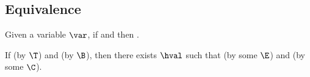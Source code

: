 \subsection*{Equivalence}
\begin{lemma}[Substitution]
\label{lem:substitution}
Given a variable $\var$, if \trahb{\hbctx}{\benv}{\bexp}{\bval} and  then .
\end{lemma}


\begin{lemma}[Soundness]
\label{lem:soundness-hb}
If \trahb{\hbctx}{\benv}{\hexp}{\bexp} (by $\T$) and \bev{\benv}{\bexp}{\bval} (by $\B$), then there exists $\hval$ such that \hev{\hexp}{\hval} (by some $\E$) and \corhb{\hbctx}{\bval}{\hval} (by some $\C$).
\end{lemma}

